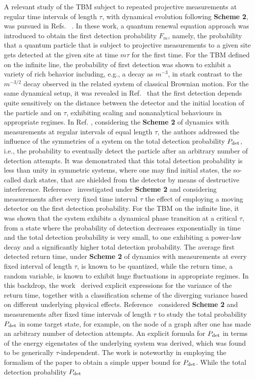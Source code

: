 \documentclass[12pt]{iopart}
\begin{document}
A relevant study of the TBM subject to repeated projective measurements at regular time intervals of length $\tau$, with dynamical evolution following {\bf Scheme 2}, was pursued in Refs. ~\cite{Friedman:2017,Friedman:2017-1}.  In these work, a quantum renewal equation approach was introduced to obtain the first detection probability $F_m$, namely, the probability that a quantum particle that is subject to projective measurements to a given site gets detected at the given site at time $m\tau$ for the first time.  For the TBM defined on the infinite line,  the probability of first detection was shown to exhibit a variety of rich behavior including, e.g., a decay as $m^{-3}$, in stark contrast to the $m^{-3/2}$ decay observed in the related system of classical Brownian motion.  For the same dynamical setup, it was revealed in Ref.~\cite{Thiel:2018} that the first detection depends quite sensitively on the distance between the detector and the initial location of the particle and on $\tau$,  exhibiting scaling and nonanalytical behaviours in appropriate regimes.  In Ref.  \cite{Thiel:2019},  considering the {\bf Scheme 2} of dynamics with measurements at regular intervals of equal length $\tau$,  the authors addressed the influence of the symmetries of a system on the total detection probability $P_{\rm det}$, i.e., the probability to eventually detect the particle after an arbitrary number of detection attempts.  It was demonstrated that this total detection probability is less than unity in symmetric systems, where one may find initial states,  the so-called dark states, that are shielded from the detector by means of destructive interference.  Reference~\cite{Meidan:2019} investigated under {\bf Scheme 2} and considering measurements after every fixed time interval $\tau$ the effect of employing a moving detector on the first detection probability.  For the TBM on the infinite line,  it was shown that the system exhibits a dynamical phase transition at a critical $\tau$,  from a state where the probability of detection decreases exponentially in time and the total detection probability is very small, to one exhibiting a power-law decay and a significantly higher total detection probability.  The average first detected return time, under {\bf Scheme 2} of dynamics with measurements at every fixed interval of length $\tau$,  is known to be quantized, while the return time,  a random variable, is known to exhibit huge fluctuations in appropriate regimes.  In this backdrop,  the work~\cite{Yin:2019} derived explicit expressions for the variance of the return time, together with a classification scheme of the diverging variance based on different underlying physical effects.  Reference~\cite{Thiel:2020} considered {\bf Scheme 2} and measurements after fixed time intervals of length $\tau$ to study the total probability $P_{\rm det}$ in some target state, for example, on the node of a graph after one has made an arbitrary number of detection attempts. An explicit formula for $P_{\rm det}$ in terms of the energy eigenstates of the underlying system was derived,  which was found to be generically $\tau$-independent.  The work is noteworthy in employing the formalism of the paper to obtain a simple upper bound for $P_{\rm det}$.   While the total detection probability $P_{\rm det}$ 
\end{document}
